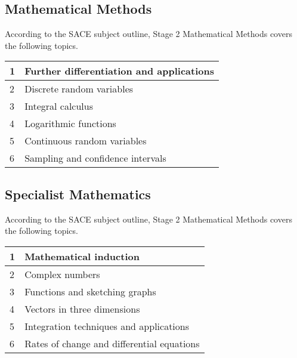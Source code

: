 \documentclass[11pt]{report}
\begin{document}
\subsection{Mathematical Methods}

    According to the SACE subject outline, Stage 2 Mathematical Methods covers the following topics.
    \begin{table}[H]
        \centering
        \begin{tabular}{|l|l|}
        \hline
            1 & Further differentiation and applications \\ \hline
            2 & Discrete random variables \\ \hline
            3 & Integral calculus \\ \hline
            4 & Logarithmic functions \\ \hline
            5 & Continuous random variables \\ \hline
            6 & Sampling and confidence intervals \\ \hline
        \end{tabular}
    \end{table}

\subsection{Specialist Mathematics}

    According to the SACE subject outline, Stage 2 Mathematical Methods covers the following topics.
    \begin{table}[H]
        \centering
        \begin{tabular}{|l|l|}
        \hline
            1 & Mathematical induction \\ \hline
            2 & Complex numbers \\ \hline
            3 & Functions and sketching graphs \\ \hline
            4 & Vectors in three dimensions \\ \hline
            5 & Integration techniques and applications \\ \hline
            6 & Rates of change and differential equations \\ \hline
        \end{tabular}
    \end{table}

\end{document}
